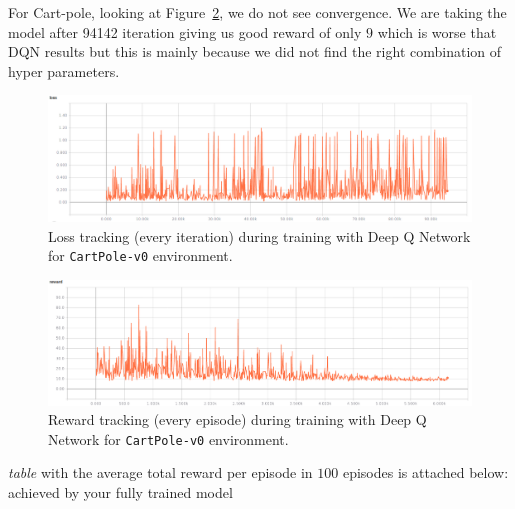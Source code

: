 \documentclass[12pt]{article}
\begin{document}
\begin{enumerate}
For Cart-pole, looking at  Figure~\ref{fig:CartPole_DQN_duelling_replay_reward}, we do not see convergence. We are taking the model after 94142 iteration giving us good reward of only $9$ which is worse that DQN results but this is mainly because we did not find the right combination of hyper parameters.
\begin{figure}[h]
  \centering
  \includegraphics[width=1\textwidth]{figures/CartPole_DQN_duelling_replay_loss.png}
  \caption{\label{fig:CartPole_DQN_duelling_replay_loss} Loss tracking (every iteration) during training with Deep Q Network for \texttt{CartPole-v0} environment.}
\end{figure}

\begin{figure}[h]
  \centering
  \includegraphics[width=1\textwidth]{figures/CartPole_DQN_duelling_replay_reward.png}
  \caption{\label{fig:CartPole_DQN_duelling_replay_reward} Reward tracking (every episode) during training with Deep Q Network for \texttt{CartPole-v0} environment.}
\end{figure}
\FloatBarrier

\end{enumerate}
\emph{table} with the average total reward per episode in $100$ episodes is attached below:
achieved by your fully trained model
\end{document}
